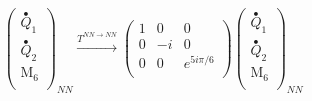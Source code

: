 \documentclass[12pt,a4paper]{article}
\newcounter{arrow}
\begin{document}
\begin{align}
\left( \begin{matrix}
\stackrel{\bullet}{Q}_{1}\\
\stackrel{\bullet}{Q}_{2}\\
\text{M}_6 \\ 
\end{matrix} \right)_{NN} \xrightarrow{T^{NN\rightarrow NN}}
\left( \begin{matrix} 
1 & 0&0 \\
0 & -i & 0 \\
0 & 0& e^{5 i \pi /6}\\
\end{matrix} \right) 
\left( \begin{matrix}
\stackrel{\bullet}{Q}_{1}\\
\stackrel{\bullet}{Q}_{2}\\
\text{M}_6 \\ 
\end{matrix} \right)_{NN}
\end{align}
\end{document}
